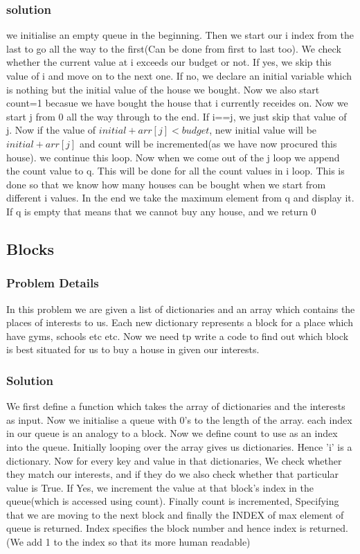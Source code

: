 \documentclass{article}
\begin{document}
\subsubsection{solution}
we initialise an empty queue in the beginning. Then we start our i index from the last to go all the way to the first(Can be done from first to last too). We check whether the current value at i exceeds our budget or not. If yes, we skip this value of i and move on to the next one. If no, we declare an initial variable which is nothing but the initial value of the house we bought. Now we also start count=1 becasue we have bought the house that i currently receides on. Now we start j from 0 all the way through to the end. If i==j, we just skip that value of j. Now if the value of $initial+arr[j]<budget$, new initial value will be $initial+arr[j]$ and count will be incremented(as we have now procured this house). we continue this loop. Now when we come out of the j loop we append the count value to q. This will be done for all the count values in i loop. This is done so that we know how many houses can be bought when we start from different i values. In the end we take the maximum element from q and display it. If q is empty that means that we cannot buy any house, and we return 0 

\subsection{Blocks}
\subsubsection{Problem Details}
In this problem we are given a list of dictionaries and an array which contains the places of interests to us. Each new dictionary represents a block for a place which have gyms, schools etc etc. Now we need tp write a code to find out which block is best situated for us to buy a house in given our interests. 

\subsubsection{Solution}
We first define a function which takes the array of dictionaries and the interests as input. Now we initialise a queue with 0's to the length of the array. each index in our queue is an analogy to a block. Now we define count to use as an index into the queue. Initially looping over the array gives us dictionaries. Hence 'i' is a dictionary. Now for every key and value in that dictionaries, We check whether they match our interests, and if they do we also check whether that particular value is True. If Yes, we increment the value at that block's index in the queue(which is accessed using count). Finally count is incremented, Specifying that we are moving to the next block and finally the INDEX of max element of queue is returned. Index specifies the block number and hence index is returned. (We add 1 to the index so that its more human readable)
\end{document}
